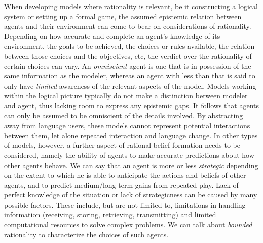 \documentclass[a4paper]{article}
\begin{document}
When developing models where rationality is relevant, be it constructing a logical system or setting up a formal game, the assumed epistemic relation between agents and their environment can come to bear on considerations of rationality.
Depending on how accurate and complete an agent's knowledge of its environment, the goals to be achieved, the choices or rules available, the relation between those choices and the objectives, etc, the verdict over the rationality of certain choices can vary.
An \emph{omniscient} agent is one that is in possession of the same information as the modeler, whereas an agent with less than that is said to only have \emph{limited} awareness of the relevant aspects of the model.
Models working within the logical picture typically do not make a distinction between modeler and agent, thus lacking room to express any epistemic gaps.
It follows that agents can only be assumed to be omniscient of the details involved.
By abstracting away from language users, these models cannot represent potential interactions between them, let alone repeated interaction and language change.
In other types of models, however, a further aspect of rational belief formation needs to be considered, namely the ability of agents to make accurate predictions about how other agents behave.
We can say that an agent is more or less \emph{strategic} depending on the extent to which he is able to anticipate the actions and beliefs of other agents, and to predict medium/long term gains from repeated play.
Lack of perfect knowledge of the situation or lack of strategicness can be caused by many possible factors.
These include, but are not limited to, limitations in handling information (receiving, storing, retrieving, transmitting) and limited computational resources to solve complex problems.
We can talk about \emph{bounded} rationality to characterize the choices of such agents.
%
\end{document}
